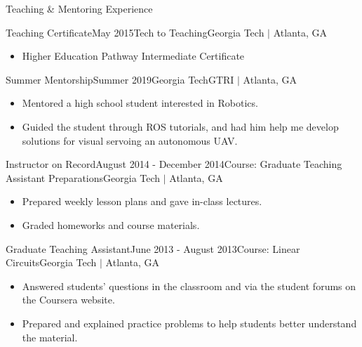 \documentclass{resume} %
\newcommand{\sectionspace}{\vspace{3mm}}
\begin{document}


\sectionspace

\begin{rSection}{Teaching \& Mentoring Experience}

\begin{rSubsection}{Teaching Certificate}{May 2015}{Tech to Teaching}{Georgia
    Tech $\vert$ Atlanta, GA}
\item
\begin{itemize}
\item Higher Education Pathway Intermediate Certificate
\end{itemize}
\end{rSubsection}


\begin{rSubsection}{Summer Mentorship}{Summer 2019}{Georgia Tech}{GTRI $\vert$ Atlanta, GA}
\item
\begin{itemize}
\item Mentored a high school student interested in Robotics.
\item Guided the student through ROS tutorials, and had him help me develop
  solutions for visual servoing an autonomous UAV.
\end{itemize}
\end{rSubsection}


\begin{rSubsection}{Instructor on Record}{August 2014 - December 2014}{Course:
    Graduate Teaching Assistant Preparations}{Georgia Tech $\vert$ Atlanta, GA}
\item
\begin{itemize}
\item Prepared weekly lesson plans and gave in-class lectures.
\item Graded homeworks and course materials.
\end{itemize}
\end{rSubsection}


\begin{rSubsection}{Graduate Teaching Assistant}{June 2013 - August
    2013}{Course: Linear Circuits}{Georgia Tech $\vert$ Atlanta, GA}
\item
\begin{itemize}
\item Answered students' questions in the classroom and via the student forums
  on the Coursera website.
\item Prepared and explained practice problems to help students better
  understand the material.
\end{itemize}
\end{rSubsection}

\end{rSection}
\end{document}
